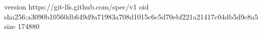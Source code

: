 version https://git-lfs.github.com/spec/v1
oid sha256:a3090b10560db649d9a71983a708d1015c6c5d70ebf221a21417c04db5d9c8a5
size 174880
